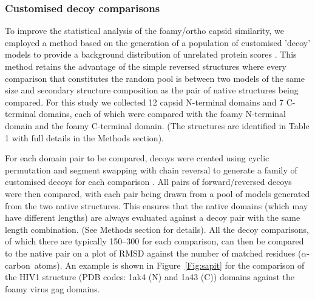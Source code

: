 \documentclass[12pt]{article}
\newcommand{\Fig}[1]{Figure~\ref{Fig:#1}}
\newcommand{\CA}{$\alpha$-carbon}
\newcommand{\3}{$3_{10}$}
\begin{document}
\subsubsection{Customised decoy comparisons}

To improve the statistical analysis of the foamy/ortho capsid similarity, we employed a method
based on the generation of a population of customised 'decoy' models to provide a background distribution
of unrelated protein scores \cite{TaylorWR06a}.  This method retains the advantage of the simple
reversed structures where every comparison that constitutes the random pool is between two models
of the same size and secondary structure composition as the pair of native structures being compared.
For this study we collected 12 capsid N-terminal domains and 7 C-terminal domains, each of which 
were compared with the foamy N-terminal domain and the foamy C-terminal domain.
(The structures are identified in Table 1 with full details in the Methods section).

For each domain pair to be compared, decoys were created using cyclic permutation and segment
swapping with chain reversal to generate a family of customised decoys for each comparison
\cite{TaylorWR06a}.  All pairs of forward/reversed decoys were then compared, with each pair being
drawn from a pool of models generated from the two native structures.  This ensures that the native
domains (which may have different lengths) are always evaluated against a decoy pair with the same
length combination.   (See Methods section for details).   All the decoy comparisons, of which
there are typically 150--300 for each comparison,  can then be compared to the native pair on a
plot of RMSD against the number of matched residues (\CA\ atoms).   An example is shown in
\Fig{sapit} for the comparison of the HIV1 structure (PDB codes: 1ak4 (N) and 1a43 (C)) domains
against the foamy virus gag domains.
 
\end{document}
